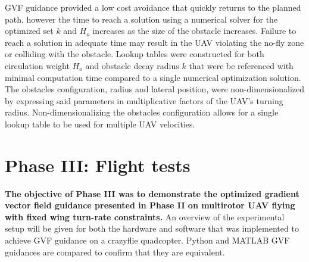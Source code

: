 \documentclass[numbered,pdftex]{ohio-etd}
\begin{document}
%




GVF guidance provided a low cost avoidance that quickly returns to the planned path, however the time to reach a solution using a numerical solver for the optimized set $k$ and $H_o$ increases as the size of the obstacle increases. Failure to reach a solution in adequate time may result in the UAV violating the no-fly zone or colliding with the obstacle. Lookup tables were constructed for both circulation weight $H_o$ and obstacle decay radius $k$ that were be referenced with minimal computation time compared to a single numerical optimization solution. The obstacles configuration, radius and lateral position, were non-dimensionalized by expressing said parameters in multiplicative factors of the UAV's turning radius. Non-dimensionalizing the obstacles configuration allows for a single lookup table to be used for multiple UAV velocities. 




\section{Phase III: Flight tests}
\textbf{The objective of Phase III was to demonstrate the optimized gradient vector field guidance presented in Phase II on multirotor UAV flying with fixed wing turn-rate constraints.} An overview of the experimental setup will be given for both the hardware and software that was implemented to achieve GVF guidance on a crazyflie quadcopter. Python and MATLAB GVF guidances are compared to confirm that they are equivalent.
\end{document}
